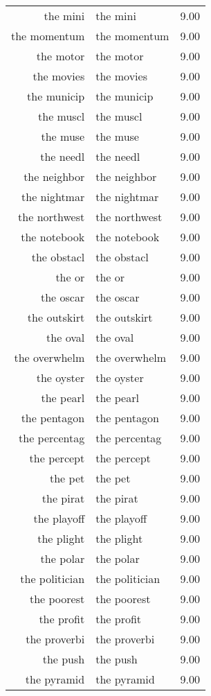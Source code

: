 \begin{table}[ht]
\begin{tabular}{rlr}
  the mini & the mini & 9.00 \\ 
  the momentum & the momentum & 9.00 \\ 
  the motor & the motor & 9.00 \\ 
  the movies & the movies & 9.00 \\ 
  the municip & the municip & 9.00 \\ 
  the muscl & the muscl & 9.00 \\ 
  the muse & the muse & 9.00 \\ 
  the needl & the needl & 9.00 \\ 
  the neighbor & the neighbor & 9.00 \\ 
  the nightmar & the nightmar & 9.00 \\ 
  the northwest & the northwest & 9.00 \\ 
  the notebook & the notebook & 9.00 \\ 
  the obstacl & the obstacl & 9.00 \\ 
  the or & the or & 9.00 \\ 
  the oscar & the oscar & 9.00 \\ 
  the outskirt & the outskirt & 9.00 \\ 
  the oval & the oval & 9.00 \\ 
  the overwhelm & the overwhelm & 9.00 \\ 
  the oyster & the oyster & 9.00 \\ 
  the pearl & the pearl & 9.00 \\ 
  the pentagon & the pentagon & 9.00 \\ 
  the percentag & the percentag & 9.00 \\ 
  the percept & the percept & 9.00 \\ 
  the pet & the pet & 9.00 \\ 
  the pirat & the pirat & 9.00 \\ 
  the playoff & the playoff & 9.00 \\ 
  the plight & the plight & 9.00 \\ 
  the polar & the polar & 9.00 \\ 
  the politician & the politician & 9.00 \\ 
  the poorest & the poorest & 9.00 \\ 
  the profit & the profit & 9.00 \\ 
  the proverbi & the proverbi & 9.00 \\ 
  the push & the push & 9.00 \\ 
  the pyramid & the pyramid & 9.00 \\ 

\end{tabular}
\end{table}

